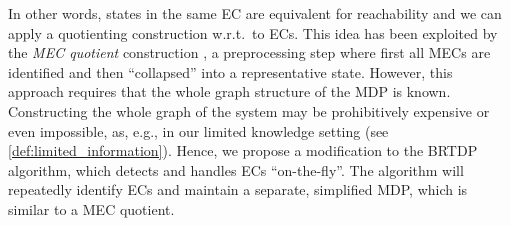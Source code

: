 \documentclass{theoretics}
\begin{document}
In other words, states in the same EC are equivalent for reachability and we can apply a quotienting construction w.r.t.\ to ECs.
This idea has been exploited by the \emph{MEC quotient} construction \cite{de1997formal,DBLP:conf/qest/CiesinskiBGK08,DBLP:conf/rp/HaddadM14}, a preprocessing step where first all MECs are identified and then \enquote{collapsed} into a representative state.
However, this approach requires that the whole graph structure of the MDP is known.
Constructing the whole graph of the system may be prohibitively expensive or even impossible, as, e.g., in our limited knowledge setting (see \cref{def:limited_information}).
Hence, we propose a modification to the BRTDP algorithm, which detects and handles ECs \enquote{on-the-fly}.
The algorithm will repeatedly identify ECs and maintain a separate, simplified MDP, which is similar to a MEC quotient.
\end{document}
